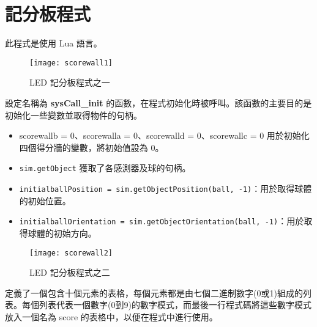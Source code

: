 \section{記分板程式}
此程式是使用 Lua 語言。\\
\begin{figure}[hbt!]
\begin{center}
\texttt{[image: scorewall1]}
\caption{\Large LED 記分板程式之一}\label{LED 記分板程式之一}
\end{center}
\end{figure} 
設定名稱為 \textbf{sysCall_init} 的函數，在程式初始化時被呼叫。該函數的主要目的是初始化一些變數並取得物件的句柄。\\
\begin{itemize}
\item scorewallb = 0、scorewalla = 0、scorewalld = 0、scorewallc = 0 用於初始化四個得分牆的變數，將初始值設為 0。\\
\item \texttt{sim.getObject} 獲取了各感測器及球的句柄。\\
\item \texttt{initialballPosition = sim.getObjectPosition(ball, -1)}：用於取得球體的初始位置。\\
\item \texttt{initialballOrientation = sim.getObjectOrientation(ball, -1)}：用於取得球體的初始方向。\\
\end{itemize}

\begin{figure}[hbt!]
\begin{center}
\texttt{[image: scorewall2]}
\caption{\Large LED 記分板程式之二}\label{LED 記分板程式之二}
\end{center}
\end{figure} 
定義了一個包含十個元素的表格，每個元素都是由七個二進制數字(0或1)組成的列表。每個列表代表一個數字(0到9)的數字模式，而最後一行程式碼將這些數字模式放入一個名為 score 的表格中，以便在程式中進行使用。\\

